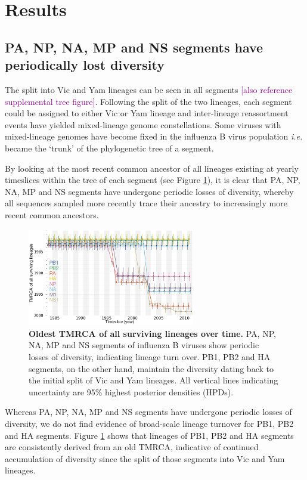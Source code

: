 \documentclass[11pt,oneside,letterpaper]{article}
\def\tbc#1{\textcolor{purple}{[#1]}}
\begin{document}
\section*{Results}

\subsection*{PA, NP, NA, MP and NS segments have periodically lost diversity}

The split into Vic and Yam lineages can be seen in all segments \cite{chen2008} \tbc{also reference supplemental tree figure}.
Following the split of the two lineages, each segment could be assigned to either Vic or Yam lineage and inter-lineage reassortment events have yielded mixed-lineage genome constellations.
Some viruses with mixed-lineage genomes have become fixed in the influenza B virus population \textit{i.e.} became the `trunk' of the phylogenetic tree of a segment.

By looking at the most recent common ancestor of all lineages existing at yearly timeslices within the tree of each segment (see Figure \ref{tmrcaOT}), it is clear that PA, NP, NA, MP and NS segments have undergone periodic losses of diversity, whereby all sequences sampled more recently trace their ancestry to increasingly more recent common ancestors.

\begin{figure}[h]
	\centering		
	\includegraphics[width=0.65\textwidth]{figures/InfB_tmrcaOT_lines.png}
	\caption{\textbf{Oldest TMRCA of all surviving lineages over time.}
PA, NP, NA, MP and NS segments of influenza B viruses show periodic losses of diversity, indicating lineage turn over.
PB1, PB2 and HA segments, on the other hand, maintain the diversity dating back to the initial split of Vic and Yam lineages.
All vertical lines indicating uncertainty are 95\% highest posterior densities (HPDs).}
	\label{tmrcaOT}
\end{figure}

Whereas PA, NP, NA, MP and NS segments have undergone periodic losses of diversity, we do not find evidence of broad-scale lineage turnover for PB1, PB2 and HA segments.
Figure \ref{tmrcaOT} shows that lineages of PB1, PB2 and HA segments are consistently derived from an old TMRCA, indicative of continued accumulation of diversity since the split of those segments into Vic and Yam lineages.
\end{document}
